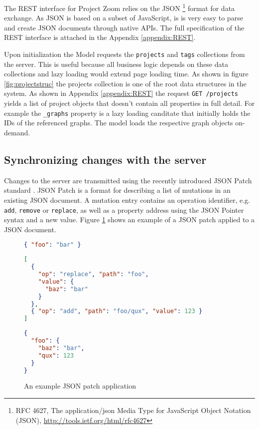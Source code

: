 The REST interface for Project Zoom relies on the JSON \footnote{RFC 4627,  The application/json Media Type for JavaScript Object Notation (JSON), \url{http://tools.ietf.org/html/rfc4627}} format for data exchange. As JSON is based on a subset of JavaScript, is is very easy to parse and create JSON documents through native APIs. The full specification of the REST interface is attached in the Appendix  \ref{appendix:REST}.

Upon initialization the Model requests the \texttt{projects} and \texttt{tags} collections from the server. This is useful because all business logic depends on these data collections and lazy loading would extend page loading time. As shown in figure \ref{fig:projectstruc} the projects collection is one of the root data structures in the system. As shown in Appendix \ref{appendix:REST} the request \texttt{GET /projects} yields a list of project objects that doesn't contain all properties in full detail. For example the \texttt{\_graphs} property is a lazy loading canditate that initially holds the IDs of the referenced graphs. The model loads the respective graph objects on-demand.


\subsection{Synchronizing changes with the server}

Changes to the server are transmitted using the recently introduced JSON Patch standard \cite{RFC6902}. JSON Patch is a format for describing a list of mutations in an existing JSON document. A mutation entry contains an operation identifier, e.g. \texttt{add}, \texttt{remove} or \texttt{replace}, as well as a property address using the JSON Pointer syntax and a new value. Figure \ref{fig:jsonpatch} shows an example of a JSON patch applied to a JSON document.

\begin{figure}
\begin{lstlisting}[language=json,caption=Initial JSON document]
{ "foo": "bar" }
\end{lstlisting}

\begin{lstlisting}[language=json,caption=JSON patch]
[
  { 
    "op": "replace", "path": "foo",
    "value": {
      "baz": "bar"
    }
  },
  { "op": "add", "path": "foo/qux", "value": 123 }
]
\end{lstlisting}

\begin{lstlisting}[language=json,caption=Resulting JSON document]
{
  "foo": {
    "baz": "bar",
    "qux": 123
  }
}
\end{lstlisting}

\caption{An example JSON patch application}
\label{fig:jsonpatch}
\end{figure}



